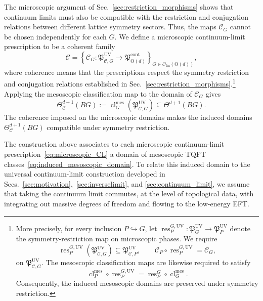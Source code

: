 \documentclass[aps,prx,reprint,superscriptaddress,twocolumn,amsmath,amssymb,amsfonts, nofootinbib]{revtex4-2}
\newcommand{\ofin}{\mathcal{O}_{\text{fin}}}
\theoremstyle{apsstyle}
\begin{document}
The microscopic argument of
Sec.~\ref{sec:restriction_morphisms} shows that continuum limits must
also be compatible with the restriction and conjugation relations
between different lattice symmetry sectors. Thus, the maps
$\mathcal C_G$ cannot be chosen independently for each $G$. We define
a microscopic continuum-limit prescription to be a coherent family
\begin{equation}
\mathcal C
=
\left\{
\mathcal C_G:
\mathfrak P_{\mathcal C,G}^{\mathrm{UV}}
\longrightarrow
\mathfrak P_{\mathrm O(d)}^{\mathrm{cont}}
\right\}_{G\in\ofin(\mathrm O(d))},
\label{eq:microscopic_continuum_family}
\end{equation}
where coherence means that the prescriptions respect the symmetry
restriction and conjugation relations established in
Sec.~\ref{sec:restriction_morphisms}.\footnote{More precisely, for every inclusion $P\hookrightarrow G$, let $\operatorname{res}^{G,\mathrm{UV}}_{P}: \mathfrak P_G^{\mathrm{UV}}\to\mathfrak P_P^{\mathrm{UV}}$ denote the symmetry-restriction map on microscopic phases. We require
\begin{equation*}
\operatorname{res}^{G,\mathrm{UV}}_{P} \left(
\mathfrak P_{\mathcal C,G}^{\mathrm{UV}} \right) \subseteq \mathfrak P_{\mathcal C,P}^{\mathrm{UV}}, \qquad \mathcal C_P\circ \operatorname{res}^{G,\mathrm{UV}}_{P} = \mathcal C_G,
\end{equation*}
on $\mathfrak P_{\mathcal C,G}^{\mathrm{UV}}$. The mesoscopic classification maps are likewise required to satisfy
\begin{equation*}
\operatorname{cl}^{\mathrm{mes}}_P \circ \operatorname{res}^{G,\mathrm{UV}}_{P}
= \operatorname{res}^{G}_{P} \circ \operatorname{cl}^{\mathrm{mes}}_G.
\end{equation*}
Consequently, the induced mesoscopic domains are preserved under symmetry restriction.} Applying the mesoscopic classification map to the domain of $\mathcal C_G$ gives
\begin{equation}
\Theta_{\mathcal C}^{d+1}(BG) := \operatorname{cl}^{\mathrm{mes}}_G
\left( \mathfrak P_{\mathcal C,G}^{\mathrm{UV}} \right)
\subseteq \Theta^{d+1}(BG).
\label{eq:induced_mesoscopic_domain}
\end{equation}
The coherence imposed on the microscopic domains makes the induced domains $\Theta_{\mathcal C}^{d+1}(BG)$ compatible under symmetry restriction. 


\bigskip 


The construction above associates to each microscopic continuum-limit prescription~\eqref{eq:microscopic_CL} a domain of mesoscopic TQFT classes~\eqref{eq:induced_mesoscopic_domain}. To relate this induced domain to the universal continuum-limit construction developed in Secs.~\ref{sec:motivation},~\ref{sec:inverselimit}, and \ref{sec:continuum_limit}, we assume that taking the continuum limit commutes, at the level of topological data, with integrating out massive degrees of freedom and flowing to the low-energy EFT.
\end{document}
